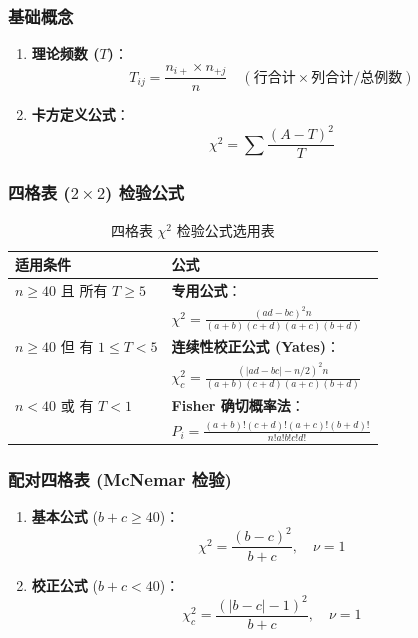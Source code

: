 \documentclass[lang=cn,10pt]{elegantbook}
\begin{document}
\subsubsection{基础概念}
\begin{enumerate}
    \item \textbf{理论频数 ($T$)}：
    \[ T_{ij} = \frac{n_{i+} \times n_{+j}}{n} \quad (\text{行合计}\times\text{列合计}/\text{总例数}) \]
    \item \textbf{卡方定义公式}：
    \[ \chi^2 = \sum \frac{(A-T)^2}{T} \]
\end{enumerate}

\subsubsection{四格表 ($2\times 2$) 检验公式}

\begin{table}[htbp]
    \centering
    \caption{四格表 $\chi^2$ 检验公式选用表}
    \begin{tabular}{p{4cm}l}
        \toprule
        \textbf{适用条件} & \textbf{公式} \\
        \midrule
        $n \ge 40$ 且 所有 $T \ge 5$ & \textbf{专用公式}： \\
        & $\displaystyle \chi^2 = \frac{(ad-bc)^2 n}{(a+b)(c+d)(a+c)(b+d)}$ \\[1em]
        \midrule
        $n \ge 40$ 但 有 $1 \le T < 5$ & \textbf{连续性校正公式 (Yates)}： \\
        & $\displaystyle \chi^2_c = \frac{(|ad-bc| - n/2)^2 n}{(a+b)(c+d)(a+c)(b+d)}$ \\[1em]
        \midrule
        $n < 40$ 或 有 $T < 1$ & \textbf{Fisher 确切概率法}： \\
        & $\displaystyle P_i = \frac{(a+b)!(c+d)!(a+c)!(b+d)!}{n!a!b!c!d!}$ \\
        \bottomrule
    \end{tabular}
\end{table}

\subsubsection{配对四格表 (McNemar 检验)}
\begin{enumerate}
    \item \textbf{基本公式} ($b+c \ge 40$)：
    \[ \chi^2 = \frac{(b-c)^2}{b+c}, \quad \nu=1 \]
    \item \textbf{校正公式} ($b+c < 40$)：
    \[ \chi^2_c = \frac{(|b-c|-1)^2}{b+c}, \quad \nu=1 \]
\end{enumerate}
\end{document}
